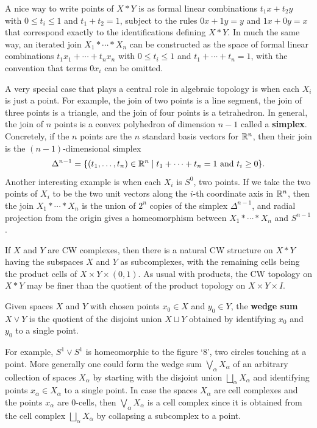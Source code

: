A nice way to write points of $X * Y$ is as formal linear combinations
$t_1 x + t_2 y$ with $0 \le t_i \le 1$ and $t_1 + t_2 = 1$, subject to the rules $0x + 1y = y$
and $1x + 0y = x$ that correspond exactly to the identifications defining $X * Y$. In
much the same way, an iterated join $X_1 * \cdots * X_n$ can be constructed as the space
of formal linear combinations $t_1 x_1 + \cdots + t_n x_n$ with $0 \le t_i \le 1$ and
$t_1 + \cdots + t_n = 1$, with the convention that terms $0 x_i$ can be omitted.

\begin{definition}[Simplex]
\label{def:simplex}
A very special case that plays a central role in algebraic topology is when each
$X_i$ is just a point. For example, the join of two points is a line segment, the join of
three points is a triangle, and the join of four points is a tetrahedron. In general, the
join of $n$ points is a convex polyhedron of dimension $n-1$ called a \textbf{simplex}.
Concretely, if the $n$ points are the $n$ standard basis vectors for $\mathbb{R}^n$, then their join
is the $(n-1)$-dimensional simplex
\[
\Delta^{n-1} = \{(t_1,\ldots,t_n) \in \mathbb{R}^n \mid t_1 + \cdots + t_n = 1 \text{ and } t_i \ge 0\}.
\]
Another interesting example is when each $X_i$ is $S^0$, two points. If we take the
two points of $X_i$ to be the two unit vectors along the $i$-th coordinate axis in $\mathbb{R}^n$,
then the join $X_1 * \cdots * X_n$ is the union of $2^n$ copies of the simplex $\Delta^{n-1}$, and
radial projection from the origin gives a homeomorphism between $X_1 * \cdots * X_n$
and $S^{n-1}$.
\end{definition}

If $X$ and $Y$ are CW complexes, then there is a natural CW structure on $X * Y$
having the subspaces $X$ and $Y$ as subcomplexes, with the remaining cells being the
product cells of $X \times Y \times (0,1)$. As usual with products, the CW topology on
$X * Y$ may be finer than the quotient of the product topology on $X \times Y \times I$.

\begin{definition}
\label{def:wedge-sum}
Given spaces $X$ and $Y$ with chosen points $x_0 \in X$ and $y_0 \in Y$, the
\textbf{wedge sum} $X \vee Y$ is the quotient of the disjoint union $X \sqcup Y$ obtained by
identifying $x_0$ and $y_0$ to a single point.
\end{definition}

For example, $S^1 \vee S^1$ is homeomorphic to the figure `8', two circles touching
at a point. More generally one could form the wedge sum $\bigvee_\alpha X_\alpha$ of an arbitrary
collection of spaces $X_\alpha$ by starting with the disjoint union $\bigsqcup_\alpha X_\alpha$ and
identifying points $x_\alpha \in X_\alpha$ to a single point. In case the spaces $X_\alpha$ are cell
complexes and the points $x_\alpha$ are 0-cells, then $\bigvee_\alpha X_\alpha$ is a cell complex since it
is obtained from the cell complex $\bigsqcup_\alpha X_\alpha$ by collapsing a subcomplex to a point.

